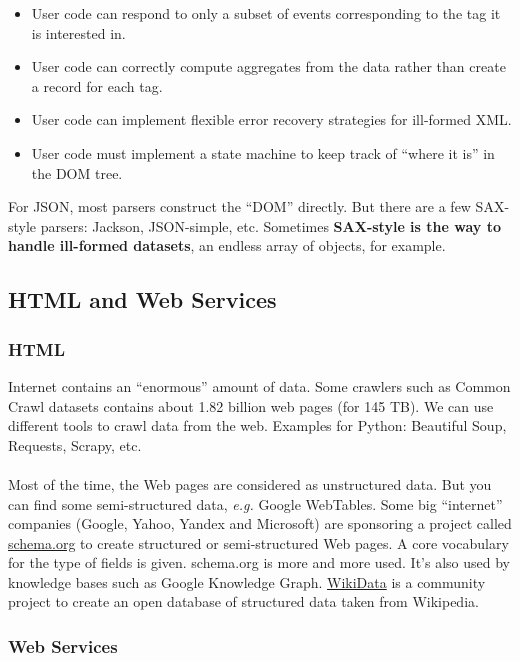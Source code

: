 \begin{itemize}
\renewcommand{\labelitemi}{{\bf +}}
 \item User code can respond to only a subset of events corresponding to the tag it is interested in.
 \item User code can correctly compute aggregates from the data rather than create a record for each tag.
 \item User code can implement flexible error recovery strategies for ill-formed XML.
\renewcommand{\labelitemi}{{\bf --}}
 \item User code must implement a state machine to keep track of ``where it is'' in the DOM tree.
\end{itemize}

For JSON, most parsers construct the ``DOM'' directly. But there are a few SAX-style parsers: Jackson, JSON-simple, etc. Sometimes {\bf SAX-style is the way to handle ill-formed datasets}, an endless array of objects, for example.

\subsection{HTML and Web Services}

\subsubsection{HTML}

Internet contains an ``enormous'' amount of data. Some crawlers such as Common Crawl datasets contains about 1.82 billion web pages (for 145 TB). We can use different tools to crawl data from the web. Examples for Python: Beautiful Soup, Requests, Scrapy, etc. 
\\\\
Most of the time, the Web pages are considered as unstructured data. But you can find some semi-structured data, {\it e.g.} Google WebTables. Some big ``internet'' companies (Google, Yahoo, Yandex and Microsoft) are sponsoring a project called \href{http://schema.org/}{schema.org} to create structured or semi-structured Web pages. A core vocabulary for the type of fields is given. schema.org is more and more used. It's also used by knowledge bases such as Google Knowledge Graph. \href{https://www.wikidata.org/wiki/Wikidata:Main\_Page}{WikiData} is a community project to create an open database of structured data taken from Wikipedia.

\subsubsection{Web Services}

